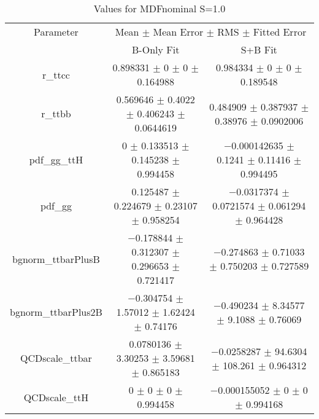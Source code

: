 \begin{table}
\centering
\caption{Values for MDFnominal S=1.0}
\begin{tabular}{ccc}
\toprule
Parameter & \multicolumn{2}{c}{Mean $\pm$ Mean Error $\pm$ RMS $\pm$ Fitted Error}\\
 & B-Only Fit & S+B Fit\\
\midrule
r\_ttcc & \num{0.898331} $\pm$ \num{0} $\pm$ \num{0} $\pm$ \num{0.164988} & \num{0.984334} $\pm$ \num{0} $\pm$ \num{0} $\pm$ \num{0.189548}\\
r\_ttbb & \num{0.569646} $\pm$ \num{0.4022} $\pm$ \num{0.406243} $\pm$ \num{0.0644619} & \num{0.484909} $\pm$ \num{0.387937} $\pm$ \num{0.38976} $\pm$ \num{0.0902006}\\
pdf\_gg\_ttH & \num{0} $\pm$ \num{0.133513} $\pm$ \num{0.145238} $\pm$ \num{0.994458} & \num{-0.000142635} $\pm$ \num{0.1241} $\pm$ \num{0.11416} $\pm$ \num{0.994495}\\
pdf\_gg & \num{0.125487} $\pm$ \num{0.224679} $\pm$ \num{0.23107} $\pm$ \num{0.958254} & \num{-0.0317374} $\pm$ \num{0.0721574} $\pm$ \num{0.061294} $\pm$ \num{0.964428}\\
bgnorm\_ttbarPlusB & \num{-0.178844} $\pm$ \num{0.312307} $\pm$ \num{0.296653} $\pm$ \num{0.721417} & \num{-0.274863} $\pm$ \num{0.71033} $\pm$ \num{0.750203} $\pm$ \num{0.727589}\\
bgnorm\_ttbarPlus2B & \num{-0.304754} $\pm$ \num{1.57012} $\pm$ \num{1.62424} $\pm$ \num{0.74176} & \num{-0.490234} $\pm$ \num{8.34577} $\pm$ \num{9.1088} $\pm$ \num{0.76069}\\
QCDscale\_ttbar & \num{0.0780136} $\pm$ \num{3.30253} $\pm$ \num{3.59681} $\pm$ \num{0.865183} & \num{-0.0258287} $\pm$ \num{94.6304} $\pm$ \num{108.261} $\pm$ \num{0.964312}\\
QCDscale\_ttH & \num{0} $\pm$ \num{0} $\pm$ \num{0} $\pm$ \num{0.994458} & \num{-0.000155052} $\pm$ \num{0} $\pm$ \num{0} $\pm$ \num{0.994168}\\
\bottomrule
\end{tabular}
\end{table}